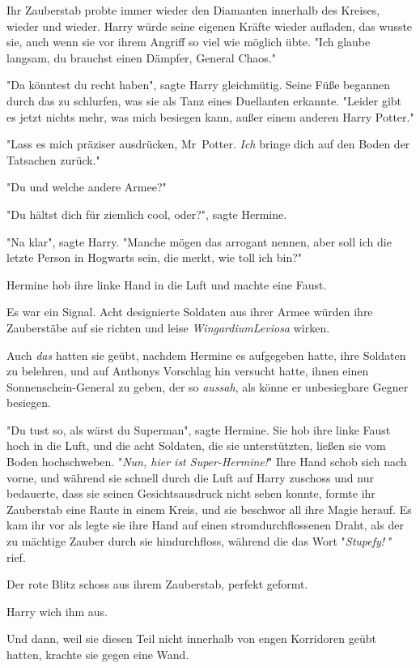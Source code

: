 {Ihr Zauberstab probte immer wieder den Diamanten innerhalb des Kreises, wieder und wieder. Harry würde seine eigenen Kräfte wieder aufladen, das wusste sie, auch wenn sie vor ihrem Angriff so viel wie möglich übte. "Ich glaube langsam, du brauchst einen Dämpfer, General Chaos."

"Da könntest du recht haben", sagte Harry gleichmütig. Seine Füße begannen durch das zu schlurfen, was sie als Tanz eines Duellanten erkannte. "Leider gibt es jetzt nichts mehr, was mich besiegen kann, außer einem anderen Harry Potter."

"Lass es mich präziser ausdrücken, Mr~Potter. \emph{Ich} bringe dich auf den Boden der Tatsachen zurück."

"Du und welche andere Armee?"

"Du hältst dich für ziemlich cool, oder?", sagte Hermine.

"Na klar", sagte Harry. "Manche mögen das arrogant nennen, aber soll ich die letzte Person in Hogwarts sein, die merkt, wie toll ich bin?"

Hermine hob ihre linke Hand in die Luft und machte eine Faust.

Es war ein Signal. Acht designierte Soldaten aus ihrer Armee würden ihre Zauberstäbe auf sie richten und leise \emph{WingardiumLeviosa} wirken.

Auch \emph{das} hatten sie geübt, nachdem Hermine es aufgegeben hatte, ihre Soldaten zu belehren, und auf Anthonys Vorschlag hin versucht hatte, ihnen einen Sonnenschein-General zu geben, der so \emph{aussah}, als könne er unbesiegbare Gegner besiegen.

"Du tust so, als wärst du Superman", sagte Hermine. Sie hob ihre linke Faust hoch in die Luft, und die acht Soldaten, die sie unterstützten, ließen sie vom Boden hochschweben. "\emph{Nun, hier ist Super-Hermine!}" Ihre Hand schob sich nach vorne, und während sie schnell durch die Luft auf Harry zuschoss und nur bedauerte, dass sie seinen Gesichtsausdruck nicht sehen konnte, formte ihr Zauberstab eine Raute in einem Kreis, und sie beschwor all ihre Magie herauf. Es kam ihr vor als legte sie ihre Hand auf einen stromdurchflossenen Draht, als der zu mächtige Zauber durch sie hindurchfloss, während die das Wort "\emph{Stupefy!} " rief.

Der rote Blitz schoss aus ihrem Zauberstab, perfekt geformt.

Harry wich ihm aus.

Und dann, weil sie diesen Teil nicht innerhalb von engen Korridoren geübt hatten, krachte sie gegen eine Wand.

}
